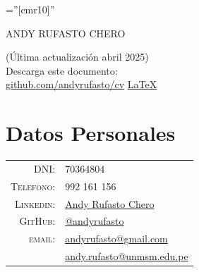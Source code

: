 \documentclass[a4paper,10pt]{article}
\begin{document}

\pagestyle{empty} %

\font\fb=''[cmr10]'' %


\par{\centering
		{\Huge ANDY RUFASTO CHERO\bigskip\par}
		}

\hfill\begin{minipage}{0.5\linewidth}
	(Última actualización abril 2025)\\ 
	Descarga este documento:\\
 	\href{https://github.com/andyrufasto/cv/blob/master/cv.pdf}{github.com/andyrufasto/cv}
	\href{https://www.github.com/andyrufasto/cv}{\LaTeX}
\end{minipage}

\section{Datos Personales}
\vspace{5mm}
\begin{tabular}{rl}
    \textsc{DNI:} & 70364804\\
    \textsc{Telefono:}     & 992 161 156\\
    \textsc{Linkedin:} & \href{https://www.linkedin.com/in/andyrufasto/}{Andy Rufasto Chero}\\
    \textsc{GitHub:}    & \href{https://www.github.com/andyrufasto}{@andyrufasto}\\
    \textsc{email:}     & \href{mailto:andyrufasto@gmail.com}{andyrufasto@gmail.com}\\ &
   \href {mailto:andy.rufasto@unmsm.edu.pe}{andy.rufasto@unmsm.edu.pe}
\end{tabular}
\vfill
\end{document}
